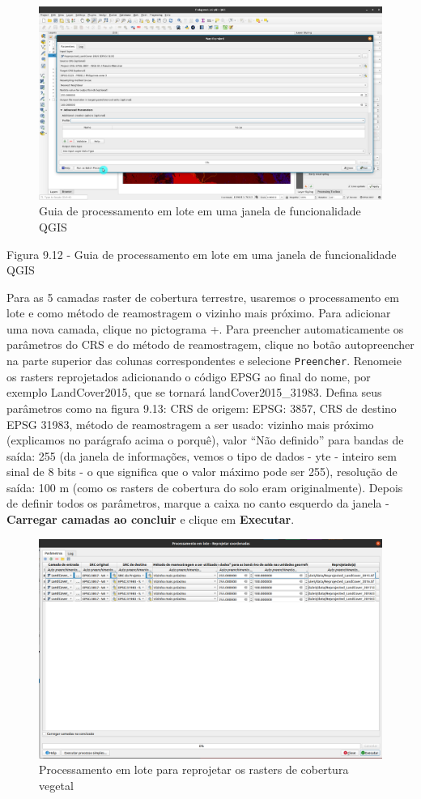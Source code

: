 \documentclass[
]{krantz}
\begin{document}
\begin{figure}
\centering
\includegraphics{media/modulo9/fig912.png}
\caption{Guia de processamento em lote em uma janela de funcionalidade QGIS}
\end{figure}

Figura 9.12 - Guia de processamento em lote em uma janela de funcionalidade QGIS

Para as 5 camadas raster de cobertura terrestre, usaremos o processamento em lote e como método de reamostragem o vizinho mais próximo. Para adicionar uma nova camada, clique no pictograma +. Para preencher automaticamente os parâmetros do CRS e do método de reamostragem, clique no botão autopreencher na parte superior das colunas correspondentes e selecione \texttt{Preencher}. Renomeie os rasters reprojetados adicionando o código EPSG ao final do nome, por exemplo LandCover2015, que se tornará landCover2015\_31983. Defina seus parâmetros como na figura 9.13: CRS de origem: EPSG: 3857, CRS de destino EPSG 31983, método de reamostragem a ser usado: vizinho mais próximo (explicamos no parágrafo acima o porquê), valor ``Não definido'' para bandas de saída: 255 (da janela de informações, vemos o tipo de dados - yte - inteiro sem sinal de 8 bits - o que significa que o valor máximo pode ser 255), resolução de saída: 100 m (como os rasters de cobertura do solo eram originalmente). Depois de definir todos os parâmetros, marque a caixa no canto esquerdo da janela - \textbf{Carregar camadas ao concluir} e clique em \textbf{Executar}.

\begin{figure}
\centering
\includegraphics{media/modulo9/fig913_a.png}
\caption{Processamento em lote para reprojetar os rasters de cobertura vegetal}
\end{figure}
\end{document}
